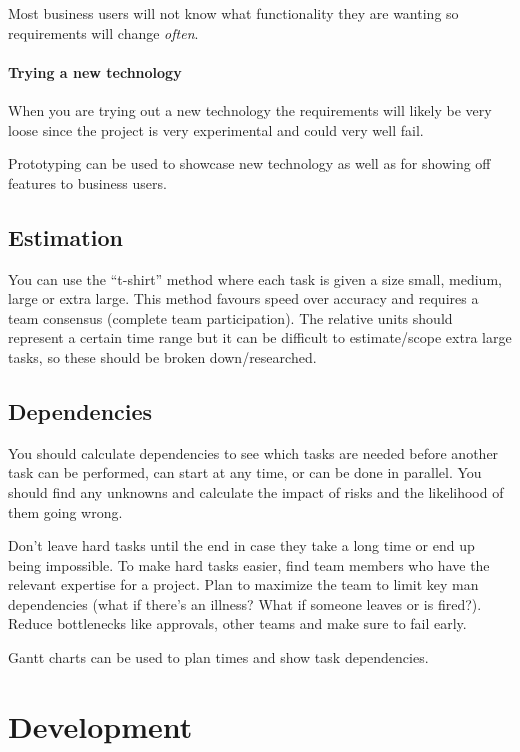 Most business users will not know what functionality they are wanting so requirements will change \emph{often}.

\paragraph{Trying a new technology}\label{par:trying_a_new_technology}

When you are trying out a new technology the requirements will likely be very loose since the project is very experimental and could very well fail.

\medskip
\noindent
Prototyping can be used to showcase new technology as well as for showing off features to business users.

\subsection{Estimation}\label{sub:estimation}

You can use the ``t-shirt'' method where each task is given a size small, medium, large or extra large.
This method favours speed over accuracy and requires a team consensus (complete team participation).
The relative units should represent a certain time range but it can be difficult to estimate/scope extra large tasks, so these should be broken down/researched.

\subsection{Dependencies}\label{sub:dependencies}

You should calculate dependencies to see which tasks are needed before another task can be performed, can start at any time, or can be done in parallel.
You should find any unknowns and calculate the impact of risks and the likelihood of them going wrong.

Don't leave hard tasks until the end in case they take a long time or end up being impossible.
To make hard tasks easier, find team members who have the relevant expertise for a project.
Plan to maximize the team to limit key man dependencies (what if there's an illness? What if someone leaves or is fired?).
Reduce bottlenecks like approvals, other teams and make sure to fail early.

Gantt charts can be used to plan times and show task dependencies.

\section{Development}\label{sec:development}

